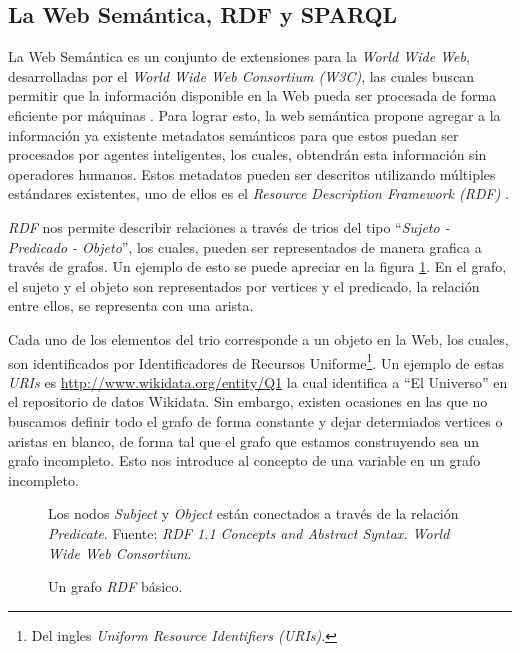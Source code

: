 
\subsection{La Web Semántica, RDF y SPARQL}

La Web Semántica es un conjunto de extensiones para la \textit{World Wide Web}, desarrolladas por el \textit{World Wide Web Consortium (W3C)}, las cuales buscan permitir que la información disponible en la Web pueda ser procesada de forma eficiente por máquinas \cite{berners2001semantic}. Para lograr esto, la web semántica propone agregar a la información ya existente metadatos semánticos para que estos puedan ser procesados por agentes inteligentes, los cuales, obtendrán esta información sin operadores humanos. Estos metadatos pueden ser descritos utilizando múltiples estándares existentes, uno de ellos es el \textit{Resource Description Framework (RDF)} \cite{world2014rdf}.

\textit{RDF} nos permite describir relaciones a través de trios del tipo ``\textit{Sujeto - Predicado - Objeto}'', los cuales, pueden ser representados de manera grafica a través de grafos. Un ejemplo de esto se puede apreciar en la figura \ref{fig:rdf-graph1}. En el grafo, el sujeto y el objeto son representados por vertices y el predicado, la relación entre ellos, se representa con una arista.

Cada uno de los elementos del trio corresponde a un objeto en la Web, los cuales, son identificados por Identificadores de Recursos Uniforme\footnote{Del ingles \textit{Uniform Resource Identifiers (URIs)}.}. Un ejemplo de estas \textit{URIs} es \href{http://www.wikidata.org/entity/Q1}{http://www.wikidata.org/entity/Q1} la cual identifica a ``El Universo'' en el repositorio de datos Wikidata. Sin embargo, existen ocasiones en las que no buscamos definir todo el grafo de forma constante y dejar determiados vertices o aristas en blanco, de forma tal que el grafo que estamos construyendo sea un grafo incompleto. Esto nos introduce al concepto de una variable en un grafo incompleto.


\begin{figure}[ht]
    \centering
    
    \caption{Un grafo \textit{RDF} básico.} Los nodos \textit{Subject} y
    \textit{Object} están conectados a través de la relación \textit{Predicate}.
    Fuente: \textit{RDF 1.1 Concepts and Abstract Syntax. World Wide Web
    Consortium}.
    \label{fig:rdf-graph1}
\end{figure}

